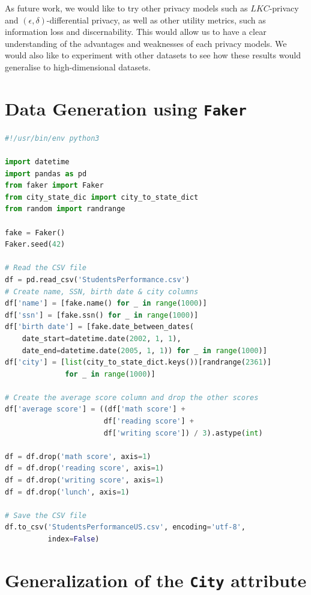 \documentclass[a4paper, 11pt]{article}
\begin{document}
As future work, we would like to try other privacy models such as $LKC$-privacy 
and $(\epsilon, \delta)$-differential privacy, as well as other utility 
metrics, such as information loss and discernability. This would allow us to 
have a clear understanding of the advantages and weaknesses of each privacy 
models. We would also like to experiment with other datasets to see how these 
results would generalise to high-dimensional datasets.

\pagebreak




\pagebreak

\appendix

\section{Data Generation using \texttt{Faker}}

\begin{lstlisting}[language=Python, caption={Python script used to generate 
random synthetic data}, label={lst:faker}]
#!/usr/bin/env python3

import datetime
import pandas as pd
from faker import Faker
from city_state_dic import city_to_state_dict
from random import randrange

fake = Faker()
Faker.seed(42)

# Read the CSV file
df = pd.read_csv('StudentsPerformance.csv')
# Create name, SSN, birth date & city columns
df['name'] = [fake.name() for _ in range(1000)]
df['ssn'] = [fake.ssn() for _ in range(1000)]
df['birth date'] = [fake.date_between_dates(
    date_start=datetime.date(2002, 1, 1),
    date_end=datetime.date(2005, 1, 1)) for _ in range(1000)]
df['city'] = [list(city_to_state_dict.keys())[randrange(2361)]
              for _ in range(1000)]

# Create the average score column and drop the other scores
df['average score'] = ((df['math score'] +
                       df['reading score'] +
                       df['writing score']) / 3).astype(int)

df = df.drop('math score', axis=1)
df = df.drop('reading score', axis=1)
df = df.drop('writing score', axis=1)
df = df.drop('lunch', axis=1)

# Save the CSV file
df.to_csv('StudentsPerformanceUS.csv', encoding='utf-8',
          index=False)
\end{lstlisting}  

\section{Generalization of the \texttt{City} attribute}
\end{document}
